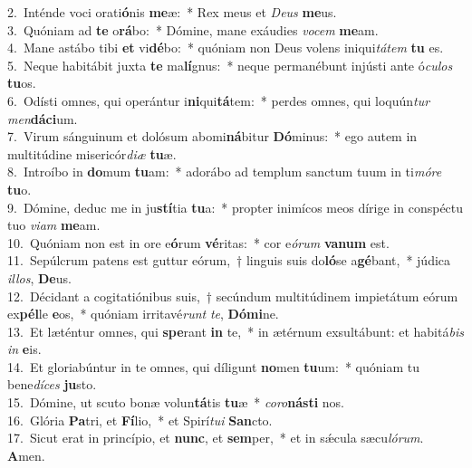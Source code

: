 {2.~}Inténde voci orati\textbf{ó}nis \textbf{me}æ:~* Rex meus et \textit{De}\textit{us} \textbf{me}us.\\
{3.~}Quóniam ad \textbf{te} o\textbf{rá}bo:~* Dómine, mane exáudies \textit{vo}\textit{cem} \textbf{me}am.\\
{4.~}Mane astábo tibi \textbf{et} vi\textbf{dé}bo:~* quóniam non Deus volens iniqui\textit{tá}\textit{tem} \textbf{tu} es.\\
{5.~}Neque habitábit juxta \textbf{te} ma\textbf{lí}gnus:~* neque permanébunt injústi ante ó\textit{cu}\textit{los} \textbf{tu}os.\\
{6.~}Odísti omnes, qui operántur i\textbf{ni}qui\textbf{tá}tem:~* perdes omnes, qui loquún\textit{tur} \textit{men}\textbf{dá}\textbf{ci}um.\\
{7.~}Virum sánguinum et dolósum abomi\textbf{ná}bitur \textbf{Dó}minus:~* ego autem in multitúdine misericór\textit{di}\textit{æ} \textbf{tu}æ.\\
{8.~}Introíbo in \textbf{do}mum \textbf{tu}am:~* adorábo ad templum sanctum tuum in ti\textit{mó}\textit{re} \textbf{tu}o.\\
{9.~}Dómine, deduc me in ju\textbf{stí}tia \textbf{tu}a:~* propter inimícos meos dírige in conspéctu tuo \textit{vi}\textit{am} \textbf{me}am.\\
{10.~}Quóniam non est in ore e\textbf{ó}rum \textbf{vé}ritas:~* cor e\textit{ó}\textit{rum} \textbf{va}\textbf{num} est.\\
{11.~}Sepúlcrum patens est guttur eórum,~† linguis suis do\textbf{ló}se a\textbf{gé}bant,~* júdica \textit{il}\textit{los}, \textbf{De}us.\\
{12.~}Décidant a cogitatiónibus suis,~† secúndum multitúdinem impietátum eórum ex\textbf{pél}le \textbf{e}os,~* quóniam irritavé\textit{runt} \textit{te}, \textbf{Dó}\textbf{mi}ne.\\
{13.~}Et læténtur omnes, qui \textbf{spe}rant \textbf{in} te,~* in ætérnum exsultábunt: et habitá\textit{bis} \textit{in} \textbf{e}is.\\
{14.~}Et gloriabúntur in te omnes, qui díligunt \textbf{no}men \textbf{tu}um:~* quóniam tu bene\textit{dí}\textit{ces} \textbf{ju}sto.\\
{15.~}Dómine, ut scuto bonæ volun\textbf{tá}tis \textbf{tu}æ~* \textit{co}\textit{ro}\textbf{ná}\textbf{sti} nos.\\
{16.~}Glória \textbf{Pa}tri, et \textbf{Fí}lio,~* et Spirí\textit{tu}\textit{i} \textbf{San}cto.\\
{17.~}Sicut erat in princípio, et \textbf{nunc}, et \textbf{sem}per,~* et in sǽcula sæcu\textit{ló}\textit{rum}. \textbf{A}men.\\
